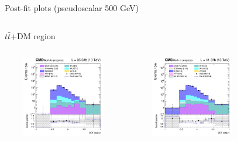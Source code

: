 \documentclass[8pt]{beamer}
\begin{document}
\begin{frame}{Post-fit plots (pseudoscalar 500 GeV)}
\vspace{-8pt}
\begin{columns}
\begin{column}{1.09\textwidth}
\begin{block}{\centering $t \bar t$+DM region}\end{block} \vspace{10pt}
\end{column}
\end{columns} \vspace{-16pt}
\begin{columns}
		\begin{column}{0.33\textwidth}
			\begin{center}
     			\includegraphics[width=1.0\textwidth, height=100pt]{figs/postfits/2016/log_cratio_TTbar_topCR_ll_BDT_ttDM500_TTbar_BDT_output_pseudoscalar500_customBinsAttempt7.png}
    		\end{center}		
		\end{column}
		\begin{column}{0.33\textwidth}
			\begin{center}
     			\includegraphics[width=1.0\textwidth, height=100pt]{figs/postfits/2017/log_cratio_TTbar_topCR_ll_BDT_ttDM500_TTbar_BDT_output_pseudoscalar500_customBinsAttempt7.png}
    		\end{center}		
		\end{column}
		\begin{column}{0.33\textwidth}
			\begin{center}

\end{center}
\end{column}
\end{columns}
\end{frame}
\end{document}
